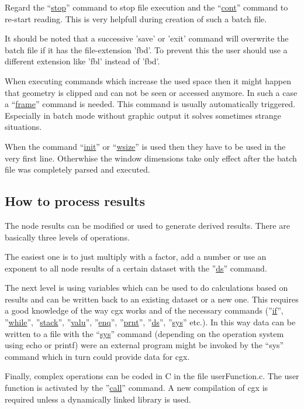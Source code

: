 \documentclass{article}
\providecommand{\htmlref}[2]{\hyperref[#2]{#1}}
\begin{document}
\begin{appendix}
Regard the ``\htmlref{stop}{stop}'' command to stop file execution and the ``\htmlref{cont}{cont}'' command to re-start reading. This is very helpfull during creation of such a batch file.

It should be noted that a successive 'save' or 'exit' command will overwrite the batch file if it has the file-extension 'fbd'. To prevent this the user should use a different extension like 'fbl' instead of 'fbd'.

When executing commands which increase the used space then it might happen that geometry is clipped and can not be seen or accessed anymore. In such a case a ``\htmlref{frame}{frame}'' command is needed. This command is usually automatically triggered. Especially in batch mode without graphic output it solves sometimes strange situations.

When the command ``\htmlref{init}{init}'' or ``\htmlref{wsize}{wsize}'' is used then they have to be used in the very first line. Otherwhise the window dimensions take only effect after the batch file was completely parsed and executed.

\subsection{\label{How to process results}How to process results}
The node results can be modified or used to generate derived results. There are basically three levels of operations.

The easiest one is to just multiply with a factor, add a number or use an exponent to all node results of a certain dataset with the ''\htmlref{ds}{ds}'' command.

The next level is using variables which can be used to do calculations based on results and can be written back to an existing dataset or a new one. This requires a good knowledge of the way cgx works and of the necessary commands (''\htmlref{if}{if}'', ''\htmlref{while}{while}'', ''\htmlref{stack}{stack}'', ''\htmlref{valu}{valu}'', ''\htmlref{enq}{enq}'', ''\htmlref{prnt}{prnt}'', ''\htmlref{ds}{ds}'', ''\htmlref{sys}{sys}'' etc.). In this way data can be written to a file with the ``\htmlref{sys}{sys}'' command (depending on the operation system using echo or printf) were an external program might be invoked by the ``sys'' command which in turn could provide data for cgx.

Finally, complex operations can be coded in C in the file userFunction.c. The
user function is activated by the ''\htmlref{call}{call}'' command. A new
compilation of cgx is required unless a dynamically linked library is used.


\end{appendix}
\end{document}

